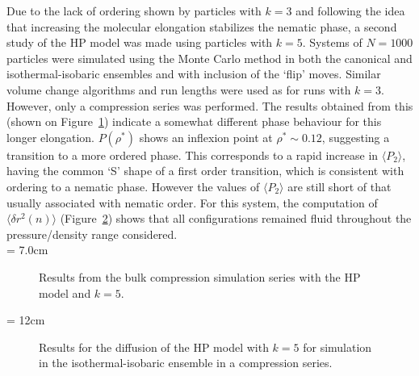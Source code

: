 Due to the lack of ordering shown by particles with $k=3$ and following the idea that
increasing the molecular elongation stabilizes the nematic phase, a second study of the HP model
was made using particles with $k=5$. 
Systems of $N=1000$ particles were simulated using the Monte Carlo method 
in both the canonical and isothermal-isobaric ensembles and with inclusion of the `flip' moves.
Similar volume change algorithms and run lengths were used as for runs with $k=3$.
However, only a compression series was performed. The results obtained from this
(shown on Figure~\ref{fig:HP_k5_phaseDia}) indicate a somewhat
different phase behaviour for this
longer elongation.  
$P(\rho^{*})$ shows an inflexion point at $\rho^{*}\sim 0.12$, suggesting a transition to a more
ordered phase. This corresponds to a rapid increase in $\langle P_2\rangle$, having the common `S' shape of a
first order transition, which is consistent with ordering to a nematic phase. However the values of 
$\langle P_2\rangle$ are still short of that usually associated with nematic order. For this system, 
the computation of 
$\langle\delta r^2(n)\rangle$ (Figure~\ref{fig:HP_k5_dc}) shows that all 
configurations remained fluid throughout the pressure/density range considered.\\

\picW = 7.0cm
\begin{figure}
	\centering
	\caption{Results from the bulk compression simulation series with the HP model and
	$k=5$.}
	\label{fig:HP_k5_phaseDia}
\end{figure}
%
\picW = 12cm
\begin{figure}
	\centering
	\caption{Results for the diffusion of the HP model with $k=5$ for simulation in the
	isothermal-isobaric ensemble in a compression series. }
	\label{fig:HP_k5_dc}
\end{figure}

